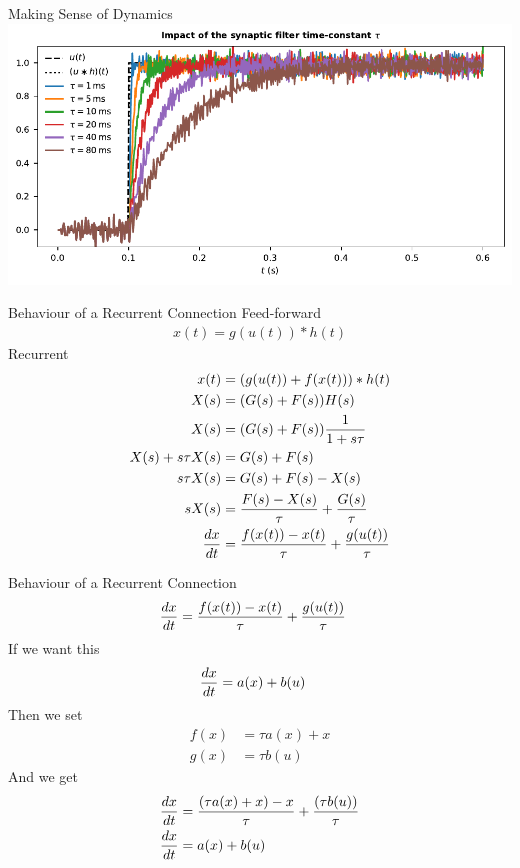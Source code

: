 \documentclass[handout,aspectratio=169]{beamer}
\begin{document}
	\begin{frame}{Making Sense of Dynamics}
		\centering
		\includegraphics[width=\textwidth]{media/synaptic_filter.pdf} 		
	\end{frame}


	\begin{frame}{Behaviour of a Recurrent Connection}
	Feed-forward
			\begin{align*}
				x(t) = g(u(t)) * h(t)				
			\end{align*}		
	Recurrent
			\begin{align*}
	x(t) &= (g(u(t)) + f(x(t))) * h(t)	\\
	X(s) &= (G(s) + F(s))H(s) \\
	X(s) &= (G(s) + F(s)){1 \over {1+s\tau}} \\
	X(s) + s\tau X(s) &= G(s) + F(s) \\
	s\tau X(s) &= G(s) + F(s) - X(s) \\
	sX(s) &= {{F(s) - X(s)} \over \tau} + {G(s) \over \tau} \\
	{dx \over dt} &= {{f(x(t))-x(t)} \over \tau} + {{g(u(t))} \over \tau}
			\end{align*}		
	
	\end{frame}

	\begin{frame}{Behaviour of a Recurrent Connection}
	\begin{align*}
		{dx \over dt} &= {{f(x(t))-x(t)} \over \tau} + {{g(u(t))} \over \tau}
	\end{align*}		
	If we want this
	\begin{align*}
	{dx \over dt} &= a(x) + b(u)
	\end{align*}
	Then we set
	\begin{align*}
	f(x) &= \tau a(x) + x \\
	g(x) &= \tau b(u)
	\end{align*}
	And we get
	\begin{align*}
	{dx \over dt} &= {{(\tau a(x) + x) - x} \over \tau} + {{(\tau b(u))} \over \tau} \\
	{dx \over dt} &= {{a(x)}} + {{b(u)}}
	\end{align*}		
	
	
			
	
	
\end{frame}
\end{document}

